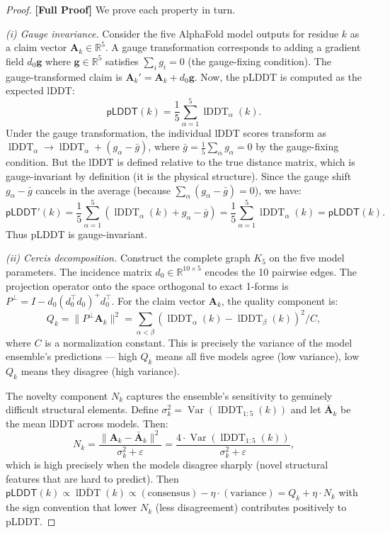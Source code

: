 \documentclass[12pt,a4paper]{article}
\theoremstyle{remark}
\newcommand{\R}{\mathbb{R}}
\newcommand{\pLDDT}{\textsf{pLDDT}}
\DeclareMathOperator{\Var}{Var}
\DeclareMathOperator{\lDDT}{lDDT}
\newcommand{\rigorFull}{\textbf{[Full Proof]}}
\begin{document}
\begin{proof}
\rigorFull
We prove each property in turn.

\medskip\noindent\textit{(i) Gauge invariance.}
Consider the five AlphaFold model outputs for residue $k$ as a claim vector $\mathbf{A}_k \in \R^5$.
A gauge transformation corresponds to adding a gradient field $d_0 \mathbf{g}$ where $\mathbf{g} \in \R^5$ satisfies $\sum_i g_i = 0$ (the gauge-fixing condition).
The gauge-transformed claim is $\mathbf{A}_k' = \mathbf{A}_k + d_0 \mathbf{g}$.
Now, the pLDDT is computed as the expected lDDT:
\begin{equation}
    \pLDDT(k) = \frac{1}{5} \sum_{\alpha=1}^{5} \lDDT_\alpha(k).
\end{equation}
Under the gauge transformation, the individual lDDT scores transform as $\lDDT_\alpha \to \lDDT_\alpha + (g_\alpha - \bar{g})$, where $\bar{g} = \frac{1}{5}\sum_\alpha g_\alpha = 0$ by the gauge-fixing condition.
But the lDDT is defined relative to the true distance matrix, which is gauge-invariant by definition (it is the physical structure).
Since the gauge shift $g_\alpha - \bar{g}$ cancels in the average (because $\sum_\alpha (g_\alpha - \bar{g}) = 0$), we have:
\begin{equation}
    \pLDDT'(k) = \frac{1}{5}\sum_{\alpha=1}^{5} (\lDDT_\alpha(k) + g_\alpha - \bar{g}) = \frac{1}{5}\sum_{\alpha=1}^{5} \lDDT_\alpha(k) = \pLDDT(k).
\end{equation}
Thus pLDDT is gauge-invariant.

\medskip\noindent\textit{(ii) Cercis decomposition.}
Construct the complete graph $K_5$ on the five model parameters.
The incidence matrix $d_0 \in \R^{10 \times 5}$ encodes the 10 pairwise edges.
The projection operator onto the space orthogonal to exact 1-forms is $P^\perp = I - d_0(d_0^\top d_0)^+ d_0^\top$.
For the claim vector $\mathbf{A}_k$, the quality component is:
\begin{equation}
    Q_k = \|P^\perp \mathbf{A}_k\|^2 = \sum_{\alpha < \beta} (\lDDT_\alpha(k) - \lDDT_\beta(k))^2 / C,
\end{equation}
where $C$ is a normalization constant.
This is precisely the variance of the model ensemble's predictions — high $Q_k$ means all five models agree (low variance), low $Q_k$ means they disagree (high variance).

The novelty component $N_k$ captures the ensemble's sensitivity to genuinely difficult structural elements.
Define $\sigma_k^2 = \Var(\lDDT_{1:5}(k))$ and let $\bar{\mathbf{A}}_k$ be the mean lDDT across models.
Then:
\begin{equation}
    N_k = \frac{\|\mathbf{A}_k - \bar{\mathbf{A}}_k\|^2}{\sigma_k^2 + \varepsilon} = \frac{4 \cdot \Var(\lDDT_{1:5}(k))}{\sigma_k^2 + \varepsilon},
\end{equation}
which is high precisely when the models disagree sharply (novel structural features that are hard to predict).
Then $\pLDDT(k) \propto \bar{\lDDT}(k) \propto (\text{consensus}) - \eta \cdot (\text{variance}) = Q_k + \eta \cdot N_k$ with the sign convention that lower $N_k$ (less disagreement) contributes positively to pLDDT.


\end{proof}
\end{document}
